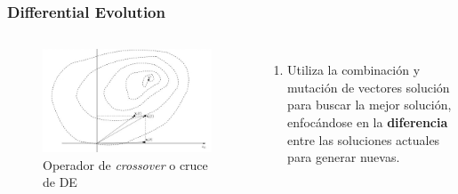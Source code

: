 \begin{frame}
  \frametitle{Differential Evolution}
  \begin{columns}
    \begin{figure}
      \begin{center}
        \includegraphics[width=1\textwidth]{imagenes/chapter3/de-crossover.png}
      \end{center}
      \caption{Operador de \textit{crossover} o cruce de DE \footnotemark[11]}
    \end{figure}
    \begin{enumerate}
      \item Utiliza la combinación y mutación de vectores solución para buscar la mejor solución, enfocándose en la \textbf{diferencia} entre las soluciones actuales para generar nuevas.
    \end{enumerate}
  \end{columns}
\end{frame}